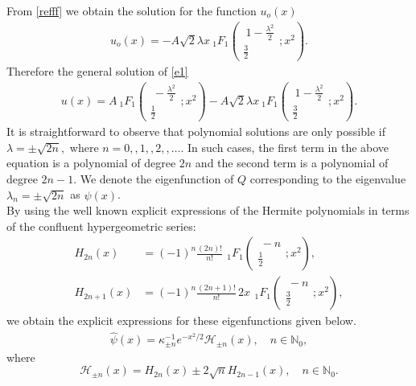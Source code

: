 \documentclass[12 pt]{amsart}
\numberwithin{equation}{section}
\begin{document}
From  \eqref{refff} we obtain the solution for the function $u_o(x)$
\begin{align*}
u_o(x)=-A \sqrt{2}\lambda x \ _{1}F_1\left(\begin{matrix} \
1-\frac{\lambda^2}{2}
\\ \frac{3}{2}
\end{matrix};x^2\right).
\end{align*}
Therefore  the general solution of \eqref{e1}
\begin{align*}
u(x)=A \ _{1}F_1\left(\begin{matrix} \
-\frac{\lambda^2}{2}
\\ \frac{1}{2}
\end{matrix};x^2\right)
-A\sqrt{2}\lambda x\ _{1}F_1\left(\begin{matrix} \
1-\frac{\lambda^2}{2}
\\ \frac{3}{2}
\end{matrix};x^2\right).
\end{align*}
It is straightforward to observe that polynomial solutions are only possible if $\lambda=\pm\sqrt{2n},$ where $n=0,,1,,2,,\dots.$ In such cases, the first term in the above equation  is a polynomial of degree $2n$ and the second term is a polynomial of degree $2n-1$. We denote the eigenfunction of $Q$ corresponding to the eigenvalue $\lambda_n=\pm \sqrt{2n}$ as $\widehat{\psi}(x)$. \\ By  using the well known explicit expressions of the Hermite polynomials in terms of the confluent hypergeometric series:
\begin{align*}
H_{2n}(x)&=(-1)^{n}{\frac {(2n)!}{n!}}\,\ _{1}F_1\left(\begin{matrix} \
-n
\\ \frac{1}{2}
\end{matrix};x^2\right),\\H_{2n+1}(x)&=(-1)^{n}{\frac {(2n+1)!}{n!}}\,2x\,\ _{1}F_1\left(\begin{matrix} \
-n
\\ \frac{3}{2}
\end{matrix};x^2\right),\end{align*}we obtain the explicit expressions for these eigenfunctions given below. \begin{align}\label{p2}
\widehat{\psi}(x)=\kappa_{\pm n}^{-1} e^{-x^2/2}\mathcal{H}_{\pm n}(x), \quad n\in \mathbb{N}_0,
\end{align}
where \begin{equation}\label{hermout}
\mathcal{H}_{\pm n}(x)= H_{2n}(x)\pm 2 \sqrt{n} H_{2n-1}(x),\quad n\in \mathbb{N}_0.
\end{equation}
\end{document}
